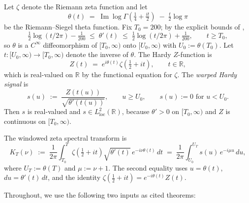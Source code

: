 \documentclass[11pt]{article}
\theoremstyle{definition}
\DeclareMathOperator{\ImOp}{Im}
\let\Im\ImOp
\begin{document}
Let $\zeta$ denote the Riemann zeta function and let
\begin{equation}\label{eq:theta}
\theta(t) \;=\; \Im\log\Gamma\!\left(\tfrac{1}{4}+\tfrac{it}{2}\right) \;-\; \tfrac{t}{2}\log\pi
\end{equation}
be the Riemann--Siegel theta function. Fix $T_{0}=200$; by the explicit
bounds of \cite[Lemma~2]{exposition},
\begin{equation}\label{eq:thetaprime}
\tfrac{1}{2}\log(t/2\pi) - \tfrac{1}{200} \;\le\; \theta'(t) \;\le\; \tfrac{1}{2}\log(t/2\pi) + \tfrac{1}{200},
\qquad t\ge T_{0},
\end{equation}
so $\theta$ is a $C^{\infty}$ diffeomorphism of $[T_{0},\infty)$ onto $[U_{0},\infty)$ with
$U_{0}:=\theta(T_{0})$. Let $t:[U_{0},\infty)\to[T_{0},\infty)$ denote the inverse of
$\theta$. The Hardy $Z$-function is
\begin{equation}\label{eq:Z}
Z(t) \;=\; e^{i\theta(t)}\zeta(\tfrac{1}{2}+it),\qquad t\in\mathbb{R},
\end{equation}
which is real-valued on $\mathbb{R}$ by the functional equation for $\zeta$.
The \emph{warped Hardy signal} is
\begin{equation}\label{eq:s}
s(u) \;:=\; \frac{Z(t(u))}{\sqrt{\theta'(t(u))}},\qquad u\ge U_{0},
\qquad s(u):=0\text{ for }u<U_{0}.
\end{equation}
Then $s$ is real-valued and $s\in L^{2}_{\mathrm{loc}}(\mathbb{R})$, because
$\theta'>0$ on $[T_{0},\infty)$ and $Z$ is continuous on $[T_{0},\infty)$.

The windowed zeta spectral transform is
\begin{equation}\label{eq:KT}
K_{T}(\nu) \;:=\; \frac{1}{2\pi}\int_{T_{0}}^{T}\zeta(\tfrac{1}{2}+it)\sqrt{\theta'(t)}\,e^{-i\nu\theta(t)}\,dt
\;=\; \frac{1}{2\pi}\int_{U_{0}}^{U_{T}} s(u)\,e^{-i\mu u}\,du,
\end{equation}
where $U_{T}:=\theta(T)$ and $\mu := \nu+1$. The second equality uses
$u=\theta(t)$, $du=\theta'(t)\,dt$, and the identity
$\zeta(\tfrac{1}{2}+it)=e^{-i\theta(t)}Z(t)$.

Throughout, we use the following two inputs as cited theorems:
\end{document}

